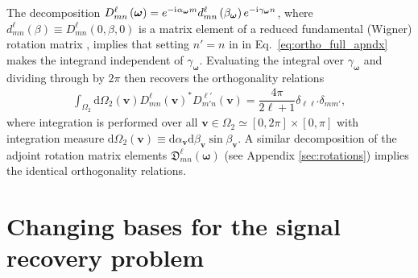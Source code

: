 \documentclass[notitlepage,twocolumn]{revtex4-2}
\newcommand{\f}[2]{\dfrac{#1}{#2}} %
\newcommand{\p}[1]{\left(#1\right)} %
\renewcommand{\v}{\bm} %
\renewcommand{\i}{\mathrm{i}\mkern1mu} %
\newcommand{\1}{\mathds{1}}
\newcommand{\D}{\mathfrak{D}}
\renewcommand{\d}{\text{d}}
\begin{document}
The decomposition $D^\ell_{mn}\p{\v\omega} = e^{-\i\alpha_{\v\omega}m} d^\ell_{mn}\p{\beta_{\v\omega}} e^{-\i\gamma_{\v\omega}n}$, where $d^\ell_{mn}\p{\beta}\equiv D^\ell_{mn}\p{0,\beta,0}$ is
a matrix element of a reduced fundamental (Wigner) rotation matrix \cite{rose1957elementary}, implies that setting $n'=n$ in in Eq.~\eqref{eq:ortho_full_apndx} makes the integrand independent of $\gamma_{\v\omega}$.
Evaluating the integral over $\gamma_{\v\omega}$ and dividing through by $2\pi$ then recovers the orthogonality relations
\begin{align}
  \int_{\Omega_2} \d\Omega_2\p{\v v}
  D^{\ell}_{mn}\p{\v v}^* D^{\ell'}_{m'n}\p{\v v}
  = \f{4\pi}{2\ell+1} \delta_{\ell\ell'} \delta_{mm'},
\end{align}
where integration is performed over all $\v v\in\Omega_2\simeq[0,2\pi]\times[0,\pi]$ with integration measure $\d\Omega_2\p{\v v} \equiv \d\alpha_{\v v} \d\beta_{\v v} \sin\beta_{\v v}$.
A similar decomposition of the adjoint rotation matrix elements $\D^\ell_{mn}\p{\v\omega}$ (see Appendix \ref{sec:rotations}) implies the identical orthogonality relations.

\section{Changing bases for the signal recovery problem}
\label{sec:basis_change}
\end{document}

